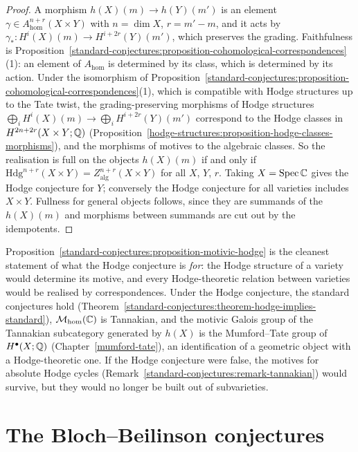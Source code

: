 \begin{proof}
A morphism $h(X)(m) \to h(Y)(m')$ is an element $\gamma \in A^{n+r}_{\mathrm{hom}}(X \times Y)$ with $n = \dim X$, $r = m' - m$, and it acts by $\gamma_* \colon H^i(X)(m) \to H^{i+2r}(Y)(m')$, which preserves the grading.
Faithfulness is Proposition~\ref{standard-conjectures:proposition-cohomological-correspondences}(1): an element of $A_{\mathrm{hom}}$ is determined by its class, which is determined by its action. Under the
isomorphism of Proposition~\ref{standard-conjectures:proposition-cohomological-correspondences}(1), which is compatible with Hodge structures up to the Tate twist, the grading-preserving morphisms of Hodge
structures $\bigoplus_iH^i(X)(m) \to \bigoplus_iH^{i+2r}(Y)(m')$ correspond to the Hodge classes in $H^{2n+2r}(X \times Y; \mathbb{Q})$ (Proposition~\ref{hodge-structures:proposition-hodge-classes-morphisms}), and the
morphisms of motives to the algebraic classes. So the realisation is full on the objects $h(X)(m)$ if and only if $\mathrm{Hdg}^{n+r}(X \times Y) = Z^{n+r}_{\mathrm{alg}}(X \times Y)$ for all $X$, $Y$, $r$. Taking $X = \operatorname{Spec}\mathbb{C}$
gives the Hodge conjecture for $Y$; conversely the Hodge conjecture for all varieties includes $X \times Y$. Fullness for general objects follows, since they are summands of the $h(X)(m)$ and morphisms between
summands are cut out by the idempotents.
\end{proof}

\begin{remark}\label{standard-conjectures:remark-motivic-galois}
Proposition~\ref{standard-conjectures:proposition-motivic-hodge} is the cleanest statement of what the Hodge conjecture is \emph{for}: the Hodge structure of a variety would determine its motive, and every
Hodge-theoretic relation between varieties would be realised by correspondences. Under the Hodge conjecture, the standard conjectures hold (Theorem~\ref{standard-conjectures:theorem-hodge-implies-standard}),
$\mathcal{M}_{\mathrm{hom}}(\mathbb{C})$ is Tannakian, and the motivic Galois group of the Tannakian subcategory generated by $h(X)$ is the Mumford--Tate group of $H^\bullet(X; \mathbb{Q})$
(Chapter~\ref{mumford-tate}), an identification of a geometric object with a Hodge-theoretic one. If the Hodge conjecture were false, the motives for absolute Hodge cycles
(Remark~\ref{standard-conjectures:remark-tannakian}) would survive, but they would no longer be built out of subvarieties.
\end{remark}

\section{The Bloch--Beilinson conjectures}\label{standard-conjectures:section-bloch-beilinson}

